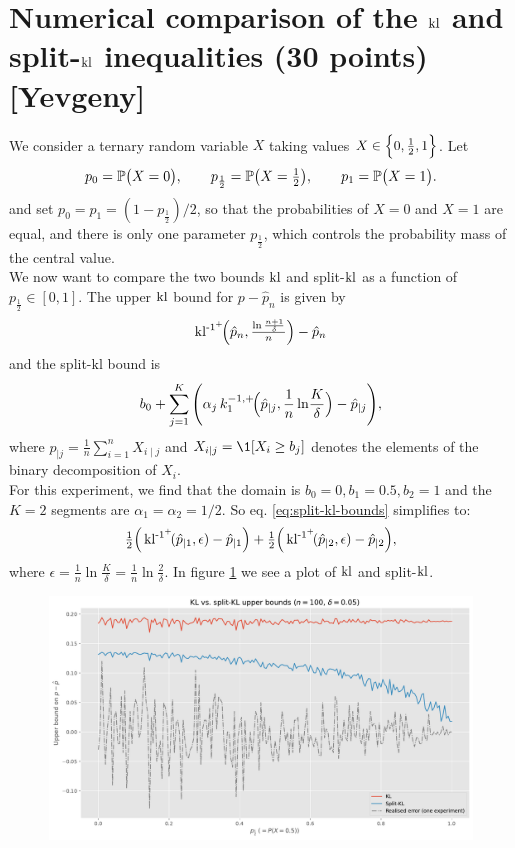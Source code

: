 \section{Numerical comparison of the \texorpdfstring{$\operatorname{kl}$}{kl} and split-\texorpdfstring{$\operatorname{kl}$}{kl} inequalities (30 points) [Yevgeny]}

We consider a ternary random variable $X$ taking values $X \in \Bigl\{0,\tfrac12,1\Bigr\}$.
Let
\[
  p_{0}= \P \bigl(X=0\bigr), \qquad
  p_{\frac12}= \P\bigl(X=\tfrac12\bigr), \qquad
  p_{1}= \P \bigl(X=1\bigr).
\]
and set \(p_{0}=p_{1}=(1-p_{\frac12})/2\), so that the probabilities of \(X=0\) and \(X=1\) are equal, and there is only one parameter \(p_{\frac12}\), which controls the 
probability mass of the central value.
\\[2mm]
We now want to compare the two bounds $\operatorname{kl}$ and split-$\operatorname{kl}$ as a function of \(p_{\frac12}\in[0,1]\). The upper $\operatorname{kl}$ bound for \(p-\hat p_{n}\) is given by
\[
\operatorname{kl^{-1^+}\!}\Bigl(\hat p_{n},
        \tfrac{\ln\frac{n+1}{\delta}}{n}
  \Bigr)
  -\hat p_{n}
\]
and the split-$\mathrm{kl}$ bound is
\begin{equation} \label{eq:split-kl-bounds}
   b_{0}+\sum_{j=1}^{K} \Bigg(  \alpha_{j}\,
   k_{1}^{-1,+}\!\Bigl(\hat{p}_{\mid j},
                       \frac{1}{n}\ln\!\frac{K}{\delta}\Bigr) - \hat{p}_{\mid j} \Bigg),
\end{equation}
where $\hat{p}_{\mid j}= \frac{1}{n}\sum_{i=1}^{n}X_{i\mid j}$ and $X_{i\mid j}= \1[X_{i}\ge b_{j}]$ denotes the elements of the binary decomposition of $X_{i}$.
\\[2mm]
For this experiment, we find that the domain is $b_0=0, b_1 = 0.5, b_2=1$ and the $K=2$ segments are $\alpha_1=\alpha_2=1/2$. So eq. \ref{eq:split-kl-bounds} simplifies to:
\[
\tfrac{1}{2} \Big( \operatorname{kl^{-1^+}\!}(\hat{p}_{\mid 1}, \epsilon ) - \hat{p}_{\mid 1} \Big)
+ \tfrac{1}{2}\Big( \operatorname{kl^{-1^+}\!}(\hat{p}_{ \mid2}, \epsilon ) - \hat{p}_{\mid 2} \Big),   
\]
where $\epsilon = \tfrac{1}{n} \ln \tfrac{K}{\delta}  = \tfrac{1}{n} \ln \tfrac{2}{\delta}.$
In figure \ref{fig:splitkl} we see a plot of $\operatorname{kl}$ and split-$\operatorname{kl}$.

\begin{figure}[ht]
\includegraphics[scale=0.5]{figures/splitkl_vs_kl.pdf}
\label{fig:splitkl}
\end{figure}


